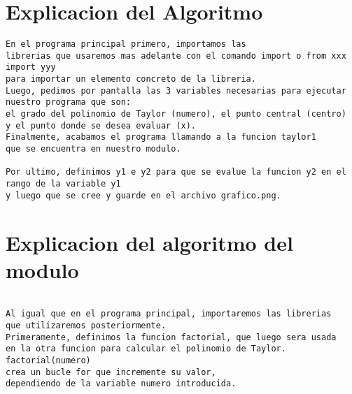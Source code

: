 \section{Explicacion del Algoritmo}
\label{Apendice2:label}

\begin{center}
\begin{footnotesize}
\begin{verbatim}
En el programa principal primero, importamos las 
librerias que usaremos mas adelante con el comando import o from xxx import yyy 
para importar un elemento concreto de la libreria.
Luego, pedimos por pantalla las 3 variables necesarias para ejecutar 
nuestro programa que son:
el grado del polinomio de Taylor (numero), el punto central (centro) 
y el punto donde se desea evaluar (x). 
Finalmente, acabamos el programa llamando a la funcion taylor1 
que se encuentra en nuestro modulo.

Por ultimo, definimos y1 e y2 para que se evalue la funcion y2 en el rango de la variable y1
y luego que se cree y guarde en el archivo grafico.png.
\end{verbatim}
\end{footnotesize}
\end{center}

\section{Explicacion del algoritmo del modulo}
\label{Apendice2:label2}

\begin{center}
\begin{footnotesize}
\begin{verbatim}

Al igual que en el programa principal, importaremos las librerias 
que utilizaremos posteriormente. 
Primeramente, definimos la funcion factorial, que luego sera usada 
en la otra funcion para calcular el polinomio de Taylor. factorial(numero) 
crea un bucle for que incremente su valor, 
dependiendo de la variable numero introducida.
 
\end{verbatim}
\end{footnotesize}
\end{center}

